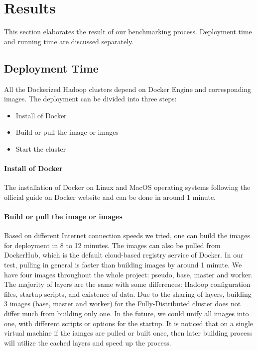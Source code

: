 \section{Results}\label{s:results}
This section elaborates the result of our benchmarking
process. Deployment time and running time are discussed separately.

\subsection{Deployment Time}

All the Dockerized Hadoop clusters depend on Docker Engine and 
corresponding images. The deployment can be divided into three steps:

\begin{itemize}
	\item Install of Docker
	\item Build or pull the image or images
	\item Start the cluster
\end{itemize}

\paragraph{Install of Docker}
	The installation of Docker on Linux and MacOS operating
	systems following the official guide on Docker website and can
	be done in around 1 minute.
	
\paragraph{Build or pull the image or images}	
	Based on different Internet connection speeds we tried, one
	can build the images for deployment in 8 to 12 minutes. The
	images can also be pulled from DockerHub, which is the default
	cloud-based registry service of Docker. In our test, pulling
	in general is faster than building images by around 1
	minute. We have four images throughout the whole project:
	pseudo, base, master and worker.  The majority of layers are
	the same with some differences: Hadoop configuration
	files, startup scripts, and existence of data. Due to the sharing of
	layers, building 3 images (base, master and worker) for the
	Fully-Distributed cluster does not differ much from building
	only one. In the future, we could unify all images into one,
	with different scripts or options for the startup. It is
	noticed that on a single virtual machine if the iamges are
	pulled or built once, then later building process will utilize
	the cached layers and speed up the process.
	
